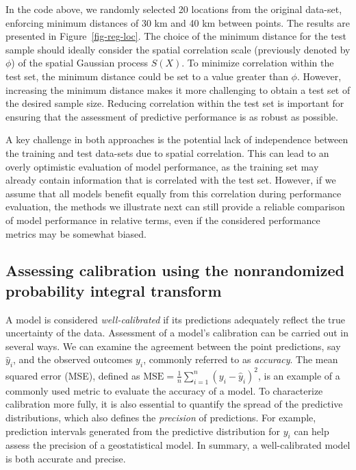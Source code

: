\documentclass[
  letterpaper,
]{krantz}
\begin{document}
In the code above, we randomly selected 20 locations from the original
data-set, enforcing minimum distances of 30 km and 40 km between points.
The results are presented in Figure~\ref{fig-reg-loc}. The choice of the
minimum distance for the test sample should ideally consider the spatial
correlation scale (previously denoted by \(\phi\)) of the spatial
Gaussian process \(S(X)\). To minimize correlation within the test set,
the minimum distance could be set to a value greater than \(\phi\).
However, increasing the minimum distance makes it more challenging to
obtain a test set of the desired sample size. Reducing correlation
within the test set is important for ensuring that the assessment of
predictive performance is as robust as possible.

A key challenge in both approaches is the potential lack of independence
between the training and test data-sets due to spatial correlation. This
can lead to an overly optimistic evaluation of model performance, as the
training set may already contain information that is correlated with the
test set. However, if we assume that all models benefit equally from
this correlation during performance evaluation, the methods we
illustrate next can still provide a reliable comparison of model
performance in relative terms, even if the considered performance
metrics may be somewhat biased.

\subsection{Assessing calibration using the nonrandomized probability
integral transform}\label{sec-anpit}

A model is considered \emph{well-calibrated} if its predictions
adequately reflect the true uncertainty of the data. Assessment of a
model's calibration can be carried out in several ways. We can examine
the agreement between the point predictions, say \(\hat{y}_i\), and the
observed outcomes \(y_i\), commonly referred to as \emph{accuracy}. The
mean squared error (MSE), defined as
\(\text{MSE} = \frac{1}{n} \sum_{i=1}^n (y_i - \hat{y}_i)^2\), is an
example of a commonly used metric to evaluate the accuracy of a model.
To characterize calibration more fully, it is also essential to quantify
the spread of the predictive distributions, which also defines the
\emph{precision} of predictions. For example, prediction intervals
generated from the predictive distribution for \(y_i\) can help assess
the precision of a geostatistical model. In summary, a well-calibrated
model is both accurate and precise.
\end{document}

